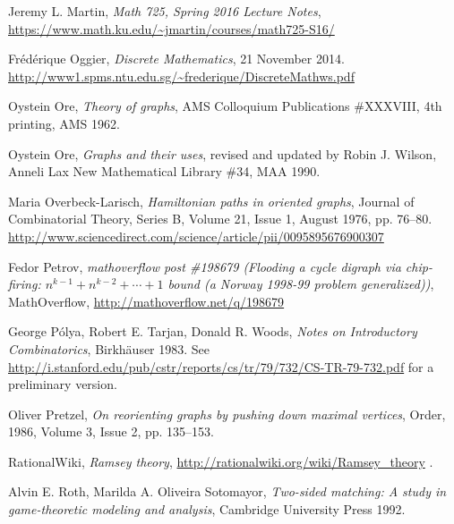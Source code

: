 \documentclass[numbers=enddot,12pt,final,onecolumn,notitlepage]{scrartcl}%
\theoremstyle{definition}
\begin{document}
\begin{thebibliography}{9999999999}
Jeremy L. Martin,
\textit{Math 725, Spring 2016 Lecture Notes},
\newline\url{https://www.math.ku.edu/~jmartin/courses/math725-S16/}


Fr\'ed\'erique Oggier,
\textit{Discrete Mathematics},
21 November 2014.
\newline\url{http://www1.spms.ntu.edu.sg/~frederique/DiscreteMathws.pdf}

Oystein Ore, \textit{Theory of graphs},
AMS Colloquium Publications \#XXXVIII,
4th printing, AMS 1962.

Oystein Ore, \textit{Graphs and their uses}, revised and updated by
Robin J. Wilson,
Anneli Lax New Mathematical Library \#34, MAA 1990.

Maria Overbeck-Larisch,
\textit{Hamiltonian paths in oriented graphs},
Journal of Combinatorial Theory, Series B,
Volume 21, Issue 1, August 1976, pp. 76--80.
\newline \url{http://www.sciencedirect.com/science/article/pii/0095895676900307}

Fedor Petrov,
\textit{mathoverflow post \#198679 (Flooding a cycle digraph via
chip-firing: $n^{k-1} + n^{k-2} + \cdots + 1$ bound (a Norway 1998-99
problem generalized))},
MathOverflow,
\newline \url{http://mathoverflow.net/q/198679}

George P\'olya, Robert E. Tarjan,
Donald R. Woods,
\textit{Notes on Introductory Combinatorics},
Birkh\"auser 1983.
\newline See
\url{http://i.stanford.edu/pub/cstr/reports/cs/tr/79/732/CS-TR-79-732.pdf}
for a preliminary version.

Oliver Pretzel,
\textit{On reorienting graphs by pushing down maximal vertices},
Order, 1986, Volume 3, Issue 2, pp. 135--153.

RationalWiki,
\textit{Ramsey theory},
\url{http://rationalwiki.org/wiki/Ramsey_theory} .

Alvin E. Roth, Marilda A. Oliveira
Sotomayor, \textit{Two-sided matching: A study in game-theoretic
modeling and analysis}, Cambridge University Press 1992.


\end{thebibliography}
\end{document}
